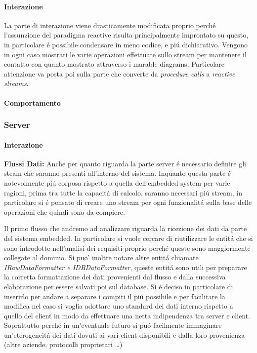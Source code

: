 \paragraph{Interazione} La parte di interazione viene drasticamente modificata proprio perch\'e l'assunzione del paradigma reactive risulta principalmente improntato su questo, in particolare \'e possibile condensare in meno codice, e pi\'u dichiarativo. Vengono in ogni caso mostrati le varie operazioni effettuate sullo stream per mantenere il contatto con quanto mostrato attraverso i marable diagrams. Particolare attenzione va posta poi sulla parte che converte da \textit{procedure calls} a \textit{reactive streams}.

\paragraph{Comportamento}

\subsubsection{Server}

\paragraph{Interazione}

\textbf{Flussi Dati:} Anche per quanto riguarda la parte server \'e necessario definire gli steam che saranno presenti all'interno del sistema. Inquanto questa parte \'e notevolmente pi\'u corposa rispetto a quella dell'embedded system per varie ragioni, prima tra tutte la capacit\'a di calcolo, saranno necessari pi\'u stream, in particolare si \'e pensato di creare uno stream per ogni funzionalit\'a sulla base delle operazioni che quindi sono da compiere.

Il primo flusso che andremo ad analizzare riguarda la ricezione dei dati da parte del sistema embedded. In particolare si vuole cercare di riutilizzare le entit\'a che si sono introdotte nell'analisi dei requisiti proprio perch\'e queste sono maggiormente collegate al dominio. Si pu\o' inoltre notare altre entit\'a chiamate \textit{IRawDataFormatter e IDBDataFormatter}, queste entit\'a sono utili per preparare la corretta formattazione dei dati provenienti dal flusso e dalla successiva elaborazione per essere salvati poi sul database. Si \'e deciso in particolare di inserirlo per andare a separare i compiti il pi\'u possibile e per facilitare la modifica nel caso si voglia adottare uno standard dei dati interno rispetto a quello del client in modo da effettuare una netta indipendenza tra server e client. Soprattutto perch\'e in un'eventuale futuro si pu\'o facilmente immaginare un'eterogeneit\'a dei dati dovuti ai vari client disponibili e dalla loro provenienza (altre aziende, protocolli proprietari \ldots)

